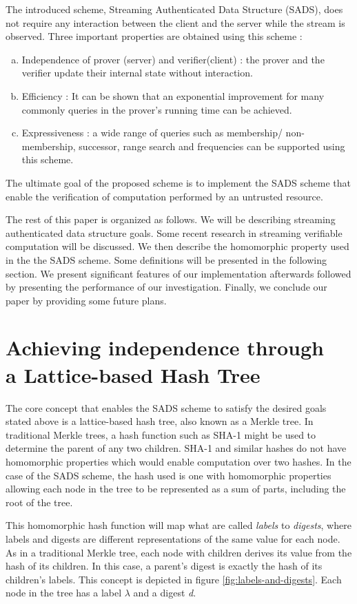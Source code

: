 \documentclass[11pt, letterpaper, oneside]{article}
\begin{document}
	The introduced scheme, Streaming Authenticated Data Structure (SADS), does not require any interaction between the client and the server while the stream is observed.
	Three important properties are obtained using this scheme :
	\begin{enumerate}[a.]
		\item Independence of prover (server) and verifier(client) : the prover and the verifier update their internal state without interaction.
		\item Efficiency : It can be shown that an exponential improvement for many commonly queries in the prover's running time can be achieved.
		\item Expressiveness : a wide range of queries such as membership/ non-membership, successor, range search and frequencies can be supported using this scheme.
	\end{enumerate} 
	The ultimate goal of the proposed scheme is to implement the SADS scheme that enable the verification of computation performed by an untrusted resource.
	
	The rest of this paper is organized as follows. We will be describing streaming authenticated data structure goals.
	Some recent research in streaming verifiable computation will be discussed.
	We then describe the homomorphic property used in the the SADS scheme. Some definitions will be presented in the following section.
	We present significant features of our implementation afterwards followed by presenting the performance of our investigation.
	Finally, we conclude our paper by providing some future plans.
	
\section{ Achieving independence through \\ a Lattice-based Hash Tree }

	The core concept that enables the SADS scheme to satisfy the desired goals stated above is a lattice-based hash tree, also known as a Merkle tree.
	In traditional Merkle trees, a hash function such as SHA-1 might be used to determine the parent of any two children.
	SHA-1 and similar hashes do not have homomorphic properties which would enable computation over two hashes.
	In the case of the SADS scheme, the hash used is one with homomorphic properties allowing each node in the tree to be represented as a sum of parts, including the root of the tree.
	
	This homomorphic hash function will map what are called \textit{labels} to \textit{digests}, where labels and digests are different representations of the same value for each node.
	As in a traditional Merkle tree, each node with children derives its value from the hash of its children.
	In this case, a parent's digest is exactly the hash of its children's labels.
	This concept is depicted in figure \ref{fig:labels-and-digests}.	
	Each node in the tree has a label $\lambda$ and a digest \textit{d}.
	
\end{document}
